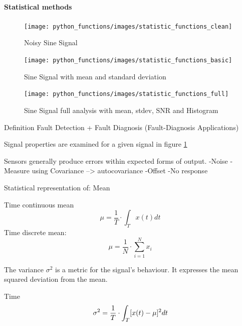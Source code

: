 \paragraph{Statistical methods}




\cite{smith_scientist_1999}
\begin{figure}[h]
    \centering
    \texttt{[image: python\_functions/images/statistic\_functions\_clean]}
    \caption{Noisy Sine Signal}
    \label{fig:statistics_clean}
\end{figure}
\begin{figure}[h]
    \centering
    \texttt{[image: python\_functions/images/statistic\_functions\_basic]}
    \caption{Sine Signal with mean and standard deviation}
    \label{fig:statistics_basic}
\end{figure}
\begin{figure}[h]
    \centering
    \texttt{[image: python\_functions/images/statistic\_functions\_full]}
    \caption{Sine Signal full analysis with mean, stdev, SNR and Histogram}
    \label{fig:statistics_full}
\end{figure}


Definition Fault Detection + Fault Diagnosis (Fault-Diagnosis Applications)


Signal properties are examined for a given signal in figure \ref{fig:statistics_clean}





Sensors generally produce errors within expected forms of output. -Noise -Measure using Covariance --> autocovariance -Offset -No response

Statistical representation of: Mean

\cite[S.13-17]{smith_scientist_1999}

Time continuous mean
\begin{equation}
    \label{eq:mean_cont}
    \mu=\frac{1}{T} \cdot \int_T x(t) d t
\end{equation}
Time discrete mean:
\begin{equation}
    \label{eq:mean_disc}
    \mu=\frac{1}{N} \cdot \sum_{i=1}^{N} x_i
\end{equation}




The variance $\sigma^2$ is a metric for the signal's behaviour. It expresses the mean squared deviation from the mean.

Time
\begin{equation}
    \label{eq:var_cont}
    \sigma^2=\frac{1}{T} \cdot \int_T[x(t)-\mu]^2 d t\\
\end{equation}

